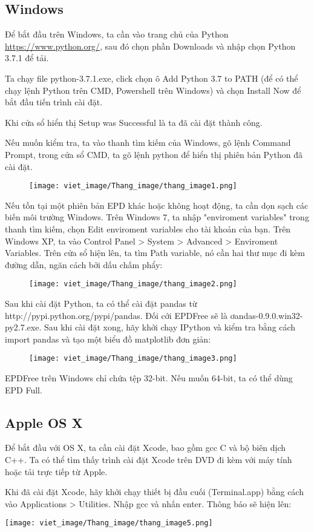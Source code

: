 \subsection{Windows}
\quad Để bắt đầu trên Windows, ta cần vào trang chủ của Python \url{https://www.python.org/}, sau đó chọn phần Downloads và nhập chọn Python 3.7.1 để tải.\par
Ta chạy file python-3.7.1.exe, click chọn ô Add Python 3.7 to PATH (để có thể chạy lệnh Python trên CMD, Powershell trên Windows) và chọn Install Now để bắt đầu tiến trình cài đặt.\par
Khi cửa sổ hiển thị Setup was Successful là ta đã cài đặt thành công.\par
Nếu muốn kiểm tra, ta vào thanh tìm kiếm của Windows, gõ lệnh Command Prompt, trong cửa sổ CMD, ta gõ lệnh python để hiển thị phiên bản Python đã cài đặt.
\begin{figure}[h]
    \centering
    \texttt{[image: viet\_image/Thang\_image/thang\_image1.png]}
\end{figure}\par
 Nếu tồn tại một phiên bản EPD khác hoặc không hoạt động, ta cần dọn sạch các biến môi trường Windows. Trên Windows 7, ta nhập "enviroment variables" trong thanh tìm kiếm, chọn Edit enviroment variables cho tài khoản của bạn. Trên Windows XP, ta vào Control Panel > System > Advanced > Enviroment Variables. Trên cửa sổ hiện lên, ta tìm Path variable, nó cần hai thư mục đi kèm đường dẫn, ngăn cách bởi dấu chấm phẩy:
 \begin{figure}[h]
    \centering
    \texttt{[image: viet\_image/Thang\_image/thang\_image2.png]}
\end{figure}\par
Sau khi cài đặt Python, ta có thể cài đặt pandas từ http://pypi.python.org/pypi/pandas. Đối cới EPDFree sẽ là ơandas-0.9.0.win32-py2.7.exe. Sau khi cài đặt xong, hãy khởi chạy IPython và kiểm tra bằng cách import pandas và tạo một biểu đồ matplotlib đơn giản:
\begin{figure}[h]
    \centering
    \texttt{[image: viet\_image/Thang\_image/thang\_image3.png]}
\end{figure}\par
EPDFree trên Windows chỉ chứa tệp 32-bit. Nếu muốn 64-bit, ta có thể dùng EPD Full. 
\subsection{Apple OS X}\par
\quad Để bắt đầu với OS X, ta cần cài đặt Xcode, bao gồm gcc C và bộ biên dịch C++. Ta có thể tìm thấy trình cài đặt Xcode trên DVD đi kèm với máy tính hoặc tải trực tiếp từ Apple.\par
Khi đã cài đặt Xcode, hãy khởi chạy thiết bị đầu cuối (Terminal.app) bằng cách vào Applications > Utilities. Nhập gcc và nhấn enter. Thông báo sẽ hiện lên:\par
\begin{center}
    \texttt{[image: viet\_image/Thang\_image/thang\_image5.png]}
\end{center}
    
